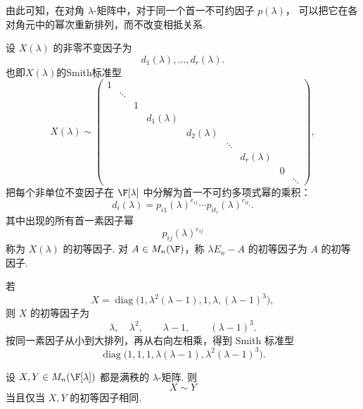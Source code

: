 由此可知，在对角 $\lambda$-矩阵中，对于同一个首一不可约因子 $p(\lambda)$，
可以把它在各对角元中的幂次重新排列，而不改变相抵关系.




\begin{definition}
	设 $X(\lambda)$ 的非零不变因子为
	\[
	d_1(\lambda),\ldots,d_r(\lambda).
	\]
	也即$X(\lambda)$的Smith标准型
	\[
	X(\lambda)\sim
	\begin{pmatrix}
		1\\
		&\ddots\\
		&&1\\
		&&&d_1(\lambda) \\
		&&&& d_2(\lambda) \\
		&&&&& \ddots \\
		&&&&&& d_r(\lambda) \\
		&&&&&&& 0 \\
		&&&&&&&& \ddots
	\end{pmatrix},
	\]
	把每个非单位不变因子在 $\F[\lambda]$ 中分解为首一不可约多项式幂的乘积：
	\[
	d_i(\lambda)=p_{i1}(\lambda)^{e_{i1}}\cdots p_{it_i}(\lambda)^{e_{it_i}}.
	\]
	其中出现的所有首一素因子幂
	\[
	p_{ij}(\lambda)^{e_{ij}}
	\]
	称为 $X(\lambda)$ 的初等因子. 对 $A\in M_n(\F)$，称 $\lambda E_n-A$ 的初等因子为 $A$ 的初等因子.
\end{definition}
\begin{example}
	若
	\[
	X=\operatorname{diag}\bigl(1,\lambda^2(\lambda-1),1,\lambda,(\lambda-1)^3\bigr),
	\]
	则 $X$ 的初等因子为
	\[
	\lambda,\quad \lambda^2,
	\qquad
	\lambda-1,
	\qquad
	(\lambda-1)^3.
	\]
	按同一素因子从小到大排列，再从右向左相乘，得到 Smith 标准型
	\[
	\operatorname{diag}\bigl(1,1,1,\lambda(\lambda-1),\lambda^2(\lambda-1)^3\bigr).
	\]
\end{example}


\begin{lemma}
	设 $X,Y\in M_n(\F[\lambda])$ 都是满秩的 $\lambda$-矩阵. 则
	\[
	X\sim Y
	\]
	当且仅当 $X,Y$ 的初等因子相同.
\end{lemma}

